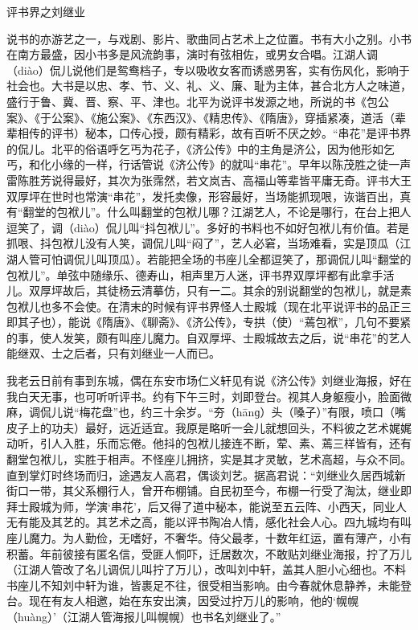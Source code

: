 \documentclass[12pt,UTF8]{ctexbook}
\begin{document}
评书界之刘继业


说书的亦游艺之一，与戏剧、影片、歌曲同占艺术上之位置。书有大小之别。小书在南方最盛，因小书多是风流韵事，演时有弦相佐，或男女合唱。江湖人调（diào）侃儿说他们是鸳鸯档子，专以吸收女客而诱惑男客，实有伤风化，影响于社会也。大书是以忠、孝、节、义、礼、义、廉、耻为主体，甚合北方人之味道，盛行于鲁、冀、晋、察、平、津也。北平为说评书发源之地，所说的书《包公案》、《于公案》、《施公案》、《东西汉》、《精忠传》、《隋唐》，穿插紧凑，道活（辈辈相传的评书）秘本，口传心授，颇有精彩，故有百听不厌之妙。“串花”是评书界的侃儿。北平的俗语呼乞丐为花子，《济公传》中的主角是济公，因为他形如乞丐，和化小缘的一样，行话管说《济公传》的就叫“串花”。早年以陈茂胜之徒一声雷陈胜芳说得最好，其次为张霈然，若文岚吉、高福山等辈皆平庸无奇。评书大王双厚坪在世时也常演“串花”，发托卖像，形容最好，当场能抓现哏，诙谐百出，真有“翻堂的包袱儿”。什么叫翻堂的包袱儿哪？江湖艺人，不论是哪行，在台上把人逗笑了，调（diào）侃儿叫“抖包袱儿”。多好的书料也不如好包袱儿有价值。若是抓哏、抖包袱儿没有人笑，调侃儿叫“闷了”，艺人必窘，当场难看，实是顶瓜（江湖人管可怕调侃儿叫顶瓜）。若能把全场的书座儿全都逗笑了，那调侃儿叫“翻堂的包袱儿”。单弦中随缘乐、德寿山，相声里万人迷，评书界双厚坪都有此拿手活儿。双厚坪故后，其徒杨云清摹仿，只有一二。其余的别说翻堂的包袱儿，就是素包袱儿也多不会使。在清末的时候有评书界怪人士殿城（现在北平说评书的品正三即其子也），能说《隋唐》、《聊斋》、《济公传》，专拱（使）“蔫包袱”，几句不要紧的事，使人发笑，颇有叫座儿魔力。自双厚坪、士殿城故去之后，说“串花”的艺人能继双、士之后者，只有刘继业一人而已。

我老云日前有事到东城，偶在东安市场仁义轩见有说《济公传》刘继业海报，好在我白天无事，也可听听评书。约有下午三时，刘即登台。视其人身躯瘦小，脸面微麻，调侃儿说“梅花盘”也，约三十余岁。“夯（hānɡ）头（嗓子）”有限，喷口（嘴皮子上的功夫）最好，远近适宜。我原是略听一会儿就想回头，不料彼之艺术娓娓动听，引人入胜，乐而忘倦。他抖的包袱儿接连不断，荤、素、蔫三样皆有，还有翻堂包袱儿，实胜于相声。不怪座儿拥挤，实是其才灵敏，艺术高超，与众不同。直到掌灯时终场而归，途遇友人高君，偶谈刘艺。据高君说：“刘继业久居西城新街口一带，其父系棚行人，曾开布棚铺。自民初至今，布棚一行受了淘汰，继业即拜士殿城为师，学演‘串花’，后又得了道中秘本，能说至五云阵、小西天，同业人无有能及其艺的。其艺术之高，能以评书陶冶人情，感化社会人心。四九城均有叫座儿魔力。为人勤俭，无嗜好，不奢华。侍父最孝，十数年红运，置有薄产，小有积蓄。年前彼接有匿名信，受匪人恫吓，迁居数次，不敢贴刘继业海报，拧了万儿（江湖人管改了名儿调侃儿叫拧了万儿），改叫刘中轩，盖其人胆小心细也。不料书座儿不知刘中轩为谁，皆裹足不往，很受相当影响。由今春就休息静养，未能登台。现在有友人相邀，始在东安出演，因受过拧万儿的影响，他的‘幌幌（huàng）’（江湖人管海报儿叫幌幌）也书名刘继业了。”
\end{document}
